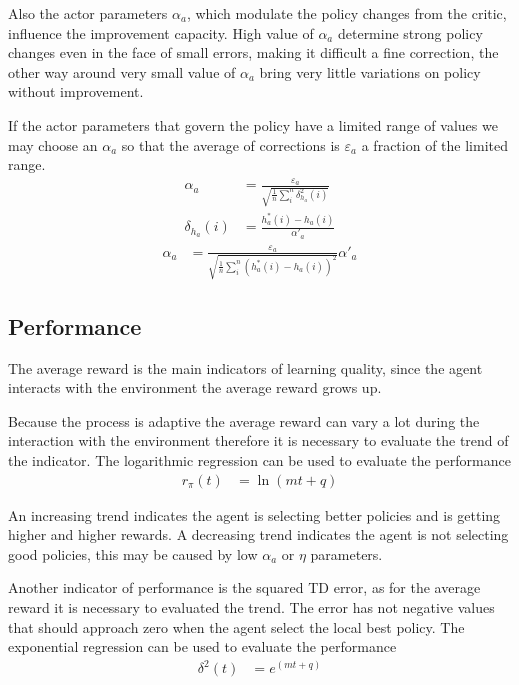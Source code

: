 \documentclass[]{article}
\begin{document}
Also the actor parameters $ \alpha_a $, which modulate the policy changes from the critic, influence the improvement capacity.
High value of $ \alpha_a $ determine strong policy changes even in the face of small errors, making it difficult a fine correction, the other way around very small value of $ \alpha_a $ bring very little variations on policy without improvement.

If the actor parameters that govern the policy have a limited range of values we may choose an $ \alpha_a $ so that the average of corrections is $ \varepsilon_a $ a fraction of the limited range.
\begin{align*}
	\alpha_a &	= \frac{\varepsilon_a}{\sqrt{\frac{1}{n} \sum_i^n \delta^2_{h_a}(i)}}
	\\
	\delta_{h_a}(i) & = \frac{h^*_a(i) -h_a(i)}{\alpha'_a} 
\end{align*}
\begin{align}
	\alpha_a &	= \frac{\varepsilon_a}{\sqrt{\frac{1}{n} \sum_i^n (h^*_a(i) - h_a(i))^{2}}}\alpha'_a
\end{align}

\subsection{Performance}

The average reward is the main indicators of learning quality, since the agent interacts with the environment the average reward grows up.

Because the process is adaptive the average reward can vary a lot during the interaction with the environment therefore it is necessary to evaluate the trend of the indicator. The logarithmic regression can be used to evaluate the performance
\begin{align}
	r_\pi(t) & = \ln (mt + q)
\end{align}

An increasing trend indicates the agent is selecting better policies and is getting higher and higher rewards.
A decreasing trend indicates the agent is not selecting good policies, this may be caused by low $ \alpha_a $ or $ \eta $ parameters.

Another indicator of performance is the squared TD error, as for the average reward it is necessary to evaluated the trend.
The error has not negative values that should approach zero when the agent select the local best policy. The exponential regression can be used to evaluate the performance
\begin{align}
	\delta^2(t) & = e^{(mt + q)}
\end{align}
\end{document}
